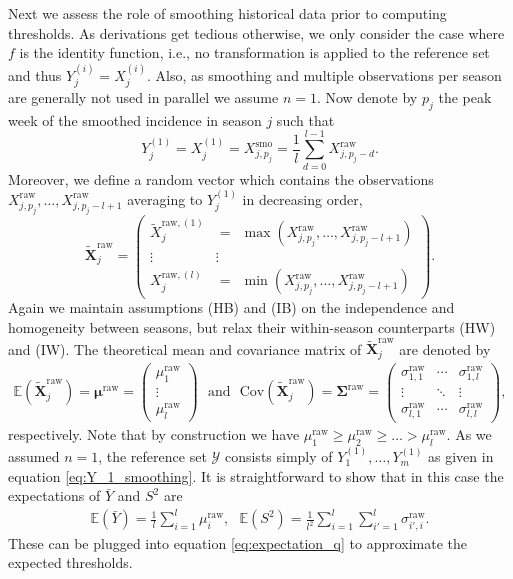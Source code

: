 \documentclass[12pt]{article}
\begin{document}
Next we assess the role of smoothing historical data prior to computing thresholds. As derivations get tedious otherwise, we only consider the case where $f$ is the identity function, i.e., no transformation is applied to the reference set and thus $
Y^{(i)}_j = X^{(i)}_j$. Also, as smoothing and multiple observations per season are generally not used in parallel we assume $n = 1$. Now denote by $p_j$ the peak week of the smoothed incidence in season $j$ such that
\begin{equation}
Y_j^{(1)} =  X_j^{(1)} = X^{\text{smo}}_{j, p_j} = \frac{1}{l} \sum_{d = 0}^{l - 1} X^{\text{raw}}_{j, p_j - d}.\label{eq:Y_1_smoothing}
\end{equation}
Moreover, we define a random vector which contains the observations $X^{\text{raw}}_{j, p_j}, \dots, X^{\text{raw}}_{j, p_j - l + 1}$ averaging to $Y_j^{(1)}$ in decreasing order,
$$
\tilde{\mathbf{X}}^\text{raw}_j = \begin{pmatrix} \tilde{X}_j^{\text{raw}, (1)} & = \ \ \max(X^{\text{raw}}_{j, p_j}, \dots, X^{\text{raw}}_{j, p_j - l + 1}) \\ \vdots & \vdots \\ X_j^{\text{raw}, (l)} & = \ \ \min(X^{\text{raw}}_{j, p_j}, \dots, X^{\text{raw}}_{j, p_j - l + 1}) \end{pmatrix}.
$$
Again we maintain assumptions (HB) and (IB) on the independence and homogeneity between seasons, but relax their within-season counterparts (HW) and (IW). The theoretical mean and covariance matrix of $\tilde{\mathbf{X}}^\text{raw}_j$ are denoted by
\begin{align}
\mathbb{E}\left(\tilde{\mathbf{X}}^\text{raw}_j\right) = \boldsymbol{\mu}^\text{raw} = \left(\begin{array}{c}
\mu^\text{raw}_1\\
\vdots\\
\mu^\text{raw}_l
\end{array}\right) \ \ \ \text{and} \ \ \ \text{Cov}\left(\tilde{\mathbf{X}}^\text{raw}_j\right) = \boldsymbol{\Sigma}^\text{raw} =
\left(\begin{array}{ccc}
\sigma^\text{raw}_{1, 1} & \cdots & \sigma^\text{raw}_{1, l}\\
\vdots & \ddots &\vdots\\
\sigma^\text{raw}_{l, 1} & \cdots & \sigma^\text{raw}_{l, l}
\end{array}\right),
\end{align}
respectively. Note that by construction we have $\mu^\text{raw}_1 \geq \mu^\text{raw}_2 \geq \dots > \mu^\text{raw}_l$. As we assumed $n = 1$, the reference set $\mathcal{Y}$ consists simply of $Y^{(1)}_1, \dots, Y^{(1)}_m$ as given in equation \eqref{eq:Y_1_smoothing}. It is straightforward to show that in this case the expectations of $\bar{Y}$ and $S^2$ are
\begin{align}
\mathbb{E}(\bar{Y}) = \frac{1}{l} \sum_{i = 1}^l \mu^\text{raw}_i, \ \ \ 
\mathbb{E}(S^2) = \frac{1}{l^2} \sum_{i = 1}^l \sum_{i' = 1}^l \sigma^\text{raw}_{i', i}.
\label{eq:expectation_moments_smoothing}
\end{align}
These can be plugged into equation \eqref{eq:expectation_q} to approximate the expected thresholds. 
\end{document}
